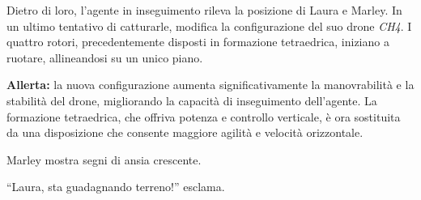 \begin{center}
\begin{minipage}{0.7\textwidth}
    \centering
\end{minipage}
\end{center}

Dietro di loro, l'agente in inseguimento rileva la posizione di Laura e Marley. In un ultimo tentativo di catturarle, modifica la configurazione del suo drone \textit{CH4}. I quattro rotori, precedentemente disposti in formazione tetraedrica, iniziano a ruotare, allineandosi su un unico piano.

\textbf{Allerta:} la nuova configurazione aumenta significativamente la manovrabilità e la stabilità del drone, migliorando la capacità di inseguimento dell'agente. La formazione tetraedrica, che offriva potenza e controllo verticale, è ora sostituita da una disposizione che consente maggiore agilità e velocità orizzontale.

Marley mostra segni di ansia crescente.

\begin{dialogue}
 \enquote{Laura, sta guadagnando terreno!} esclama.
\end{dialogue}

